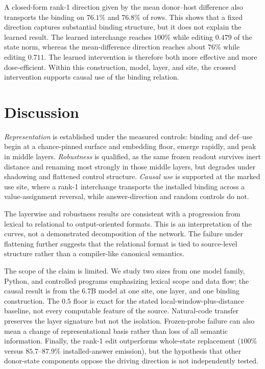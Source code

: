 \documentclass{article}
\begin{document}
A closed-form rank-1 direction given by the mean donor--host difference also transports the binding on $76.1\%$ and $76.8\%$ of rows. This shows that a fixed direction captures substantial binding structure, but it does not explain the learned result. The learned interchange reaches $100\%$ while editing $0.479$ of the state norm, whereas the mean-difference direction reaches about $76\%$ while editing $0.711$. The learned intervention is therefore both more effective and more dose-efficient. Within this construction, model, layer, and site, the crossed intervention supports causal use of the binding relation.

\section{Discussion}
\label{sec:discussion}

\emph{Representation} is established under the measured controls: binding and def--use begin at a chance-pinned surface and embedding floor, emerge rapidly, and peak in middle layers. \emph{Robustness} is qualified, as the same frozen readout survives inert distance and renaming most strongly in those middle layers, but degrades under shadowing and flattened control structure. \emph{Causal use} is supported at the marked use site, where a rank-1 interchange transports the installed binding across a value-assignment reversal, while answer-direction and random controls do not.

The layerwise and robustness results are consistent with a progression from lexical to relational to output-oriented formats. This is an interpretation of the curves, not a demonstrated decomposition of the network. The failure under flattening further suggests that the relational format is tied to source-level structure rather than a compiler-like canonical semantics.

The scope of the claim is limited. We study two sizes from one model family, Python, and controlled programs emphasizing lexical scope and data flow; the causal result is from the 6.7B model at one site, one layer, and one binding construction. The $0.5$ floor is exact for the stated local-window-plus-distance baseline, not every computable feature of the source. Natural-code transfer preserves the layer signature but not the isolation. Frozen-probe failure can also mean a change of representational basis rather than loss of all semantic information. Finally, the rank-1 edit outperforms whole-state replacement ($100\%$ versus $85.7$--$87.9\%$ installed-answer emission), but the hypothesis that other donor-state components oppose the driving direction is not independently tested.
\end{document}
